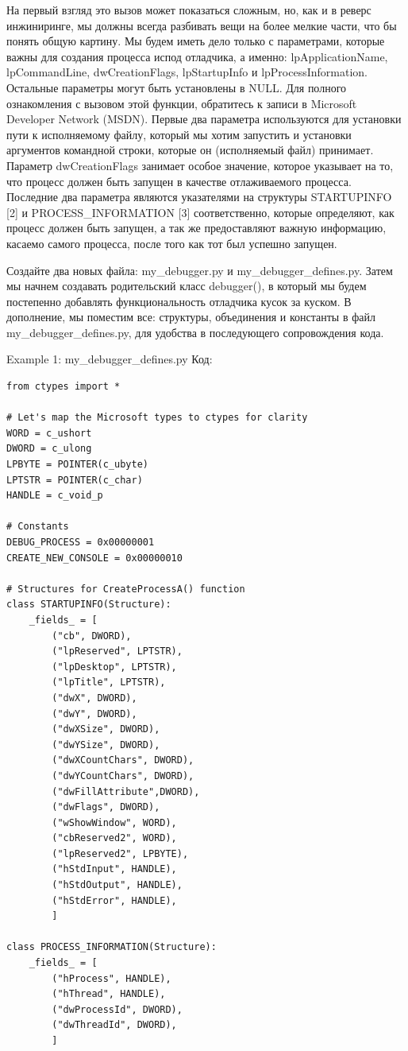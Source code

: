 \documentclass[12pt, a4paper, oneside]{book}
\begin{document}
На первый взгляд это вызов может показаться сложным, но, как и в реверс инжиниринге, мы должны всегда разбивать вещи на более мелкие части, что бы понять общую картину. Мы будем иметь дело только с параметрами, которые важны для создания процесса испод отладчика, а именно: lpApplicationName, lpCommandLine, dwCreationFlags, lpStartupInfo и lpProcessInformation. Остальные параметры могут быть установлены в NULL. Для полного ознакомления с вызовом этой функции, обратитесь к записи в Microsoft Developer Network (MSDN). Первые два параметра используются для установки пути к исполняемому файлу, который мы хотим запустить и установки аргументов командной строки, которые он (исполняемый файл) принимает. Параметр dwCreationFlags занимает особое значение, которое указывает на то, что процесс должен быть запущен в качестве отлаживаемого процесса. Последние два параметра являются указателями на структуры STARTUPINFO [2] и PROCESS\_INFORMATION [3] соответственно, которые определяют, как процесс должен быть запущен, а так же предоставляют важную информацию, касаемо самого процесса, после того как тот был успешно запущен.

Создайте два новых файла: my\_debugger.py и my\_debugger\_defines.py. Затем мы начнем создавать родительский класс debugger(), в который мы будем постепенно добавлять функциональность отладчика кусок за куском. В дополнение, мы поместим все: структуры, объединения и константы в файл my\_debugger\_defines.py, для удобства в последующего сопровождения кода.

Example 1: my\_debugger\_defines.py
Код:
\begin{verbatim}
from ctypes import *

# Let's map the Microsoft types to ctypes for clarity
WORD = c_ushort
DWORD = c_ulong
LPBYTE = POINTER(c_ubyte)
LPTSTR = POINTER(c_char)
HANDLE = c_void_p

# Constants
DEBUG_PROCESS = 0x00000001
CREATE_NEW_CONSOLE = 0x00000010

# Structures for CreateProcessA() function
class STARTUPINFO(Structure):
    _fields_ = [
        ("cb", DWORD),
        ("lpReserved", LPTSTR),
        ("lpDesktop", LPTSTR),
        ("lpTitle", LPTSTR),
        ("dwX", DWORD),
        ("dwY", DWORD),
        ("dwXSize", DWORD),
        ("dwYSize", DWORD),
        ("dwXCountChars", DWORD),
        ("dwYCountChars", DWORD),
        ("dwFillAttribute",DWORD),
        ("dwFlags", DWORD),
        ("wShowWindow", WORD),
        ("cbReserved2", WORD),
        ("lpReserved2", LPBYTE),
        ("hStdInput", HANDLE),
        ("hStdOutput", HANDLE),
        ("hStdError", HANDLE),
        ]

class PROCESS_INFORMATION(Structure):
    _fields_ = [
        ("hProcess", HANDLE),
        ("hThread", HANDLE),
        ("dwProcessId", DWORD),
        ("dwThreadId", DWORD),
        ]
\end{verbatim}
\end{document}
